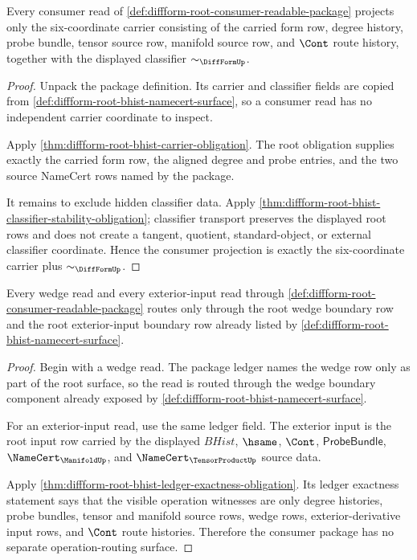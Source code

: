 \begin{theorem}
\label{thm:diffform-root-consumer-carrier-projection}
Every consumer read of
\autoref{def:diffform-root-consumer-readable-package} projects only the
six-coordinate carrier consisting of the carried form row, degree history,
probe bundle, tensor source row, manifold source row, and $\Cont$ route
history, together with the displayed classifier $\sim_{\DiffFormUp}$.
\end{theorem}
\begin{proof}
Unpack the package definition. Its carrier and classifier fields are copied
from \autoref{def:diffform-root-bhist-namecert-surface}, so a consumer read
has no independent carrier coordinate to inspect.

Apply \autoref{thm:diffform-root-bhist-carrier-obligation}. The root
obligation supplies exactly the carried form row, the aligned degree and
probe entries, and the two source NameCert rows named by the package.

It remains to exclude hidden classifier data. Apply
\autoref{thm:diffform-root-bhist-classifier-stability-obligation}; classifier
transport preserves the displayed root rows and does not create a tangent,
quotient, standard-object, or external classifier coordinate. Hence the
consumer projection is exactly the six-coordinate carrier plus
$\sim_{\DiffFormUp}$.
\end{proof}

\begin{theorem}
\label{thm:diffform-root-consumer-operation-routing}
Every wedge read and every exterior-input read through
\autoref{def:diffform-root-consumer-readable-package} routes only through the
root wedge boundary row and the root exterior-input boundary row already
listed by \autoref{def:diffform-root-bhist-namecert-surface}.
\end{theorem}
\begin{proof}
Begin with a wedge read. The package ledger names the wedge row only as part
of the root surface, so the read is routed through the wedge boundary
component already exposed by
\autoref{def:diffform-root-bhist-namecert-surface}.

For an exterior-input read, use the same ledger field. The exterior input is
the root input row carried by the displayed $BHist$, $\hsame$, $\Cont$,
$\mathsf{ProbeBundle}$, $\NameCert_{\ManifoldUp}$, and
$\NameCert_{\TensorProductUp}$ source data.

Apply \autoref{thm:diffform-root-bhist-ledger-exactness-obligation}. Its
ledger exactness statement says that the visible operation witnesses are
only degree histories, probe bundles, tensor and manifold source rows, wedge
rows, exterior-derivative input rows, and $\Cont$ route histories. Therefore
the consumer package has no separate operation-routing surface.
\end{proof}

